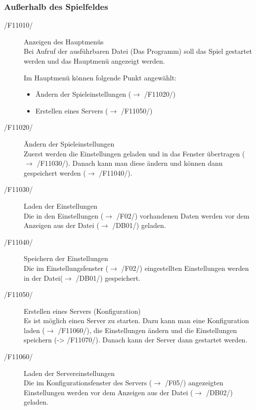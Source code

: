 \documentclass[a4paper,10pt]{article}
\begin{document}
\subsubsection{Außerhalb des Spielfeldes}
\begin{description}
\item[/F11010/] Anzeigen des Hauptmenüs \\
Bei Aufruf der ausführbaren Datei (Das Programm) soll das Spiel gestartet werden und das Hauptmenü angezeigt werden.

Im Hauptmenü können folgende Punkt angewählt:
\begin{itemize}
\item Ändern der Spieleinstellungen ($\rightarrow$ /F11020/)
\item Erstellen eines Servers ($\rightarrow$ /F11050/)
\end{itemize}

\item[/F11020/] Ändern der Spieleinstellungen \\
Zuerst werden die Einstellungen geladen und in das Fenster übertragen ($\rightarrow$ /F11030/). Danach kann man diese ändern und können dann gespeichert werden ($\rightarrow$ /F11040/).

\item[/F11030/] Laden der Einstellungen \\
Die in den Einstellungen ($\rightarrow$ /F02/) vorhandenen Daten werden vor dem Anzeigen aus der Datei ($\rightarrow$ /DB01/) geladen.

\item[/F11040/] Speichern der Einstellungen \\
Die im Einstellungsfenster ($\rightarrow$ /F02/) eingestellten Einstellungen werden in der Datei($\rightarrow$ /DB01/) gespeichert.

\item[/F11050/] Erstellen eines Servers (Konfiguration) \\
Es ist möglich einen Server zu starten. Dazu kann man eine Konfiguration laden ($\rightarrow$ /F11060/), die Einstellungen ändern und die Einstellungen speichern (-> /F11070/). Danach kann der Server dann gestartet werden.

\item[/F11060/] Laden der Servereinstellungen \\
Die im Konfigurationsfenster des Servers ($\rightarrow$ /F05/) angezeigten Einstellungen werden vor dem Anzeigen aus der Datei ($\rightarrow$ /DB02/) geladen.


\end{description}
\end{document}
